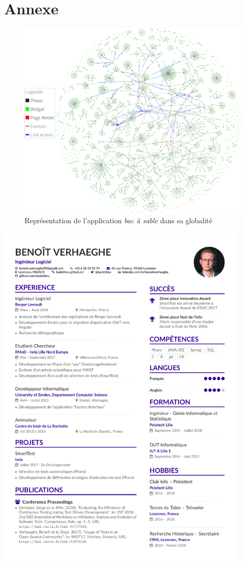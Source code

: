 \hypertarget{annexe}{%
\section{Annexe}\label{annexe}}

\hypertarget{firework}{%
\begin{figure}
\centering
\includegraphics{figures/firework.png}
\caption{Représentation de l'application \emph{bac à sable} dans sa
globalité}\label{firework}
\end{figure}
}

\includegraphics[width=0.9\textwidth,height=\textheight]{cv/cv.pdf}
\newpage

